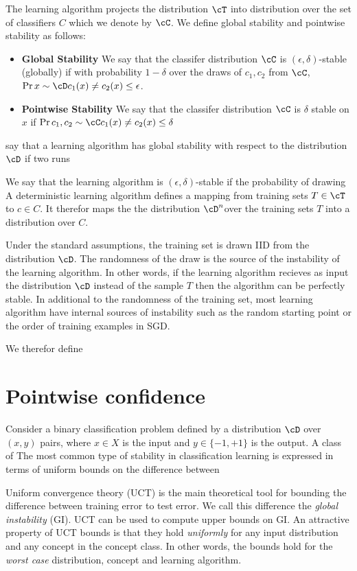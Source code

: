 The learning algorithm projects the distribution $\cT$ into
distribution over the set of classifiers $C$ which we denote by
$\cC$.  We define global stability and pointwise stability as
follows:
\begin{itemize}
\item {\bf Global Stability} We say that
the classifer distribution $\cC$ is $(\epsilon,\delta)$-stable (globally) if with
probability $1-\delta$ over the draws of $c_1,c_2$ from $\cC$,  $\Pr{x \sim
  \cD}{c_1(x)\neq c_2(x)}\leq \epsilon$.
\item {\bf Pointwise Stability} We say that the classifer distribution
  $\cC$ is $\delta$ stable on $x$ if $\Pr{c_1,c_2 \sim \cC}{c_1(x)
    \neq c_2(x)} \leq \delta$
\end{itemize}

say that a learning algorithm has global stability with respect to
the distribution $\cD$ if two runs 

We say that the learning
algorithm is $(\epsilon,\delta)$-stable if the probability of drawing 
A deterministic learning algorithm defines a mapping from
training sets $T \in \cT$ to $c\in C$. It therefor maps the the
distribution $\cD^n$over the training sets $T$ into a distribution
over $C$.

Under the standard assumptions, the training set is drawn IID from the
distribution $\cD$. The randomness of the draw is the source of the
instability of the learning algorithm. In other words, if the learning
algorithm recieves as input the distribution $\cD$ instead of the
sample $T$ then the algorithm can be perfectly stable. In additional
to the randomness of the training set, most learning algorithm have
internal sources of instability such as the random starting point
or the order of training examples in SGD.

We therefor define 


\iffalse

\section{Pointwise confidence}

Consider a binary classification problem defined by a distribution
$\cD$ over $(x,y)$ pairs, where $x \in X$ is the input and $y \in
\{-1,+1\}$ is the output. A class of 
The most common type of stability in classification learning is
expressed in terms of uniform bounds on the difference between 


Uniform convergence theory (UCT) is the main theoretical tool for
bounding the difference between training error to test error. We call
this difference the {\em global instability} (GI).  UCT can be used to
compute upper bounds on GI.  An attractive property of UCT bounds is
that they hold {\em uniformly} for any input distribution and any
concept in the concept class. In other words, the bounds hold for the
{\em worst case} distribution, concept and learning algorithm.

